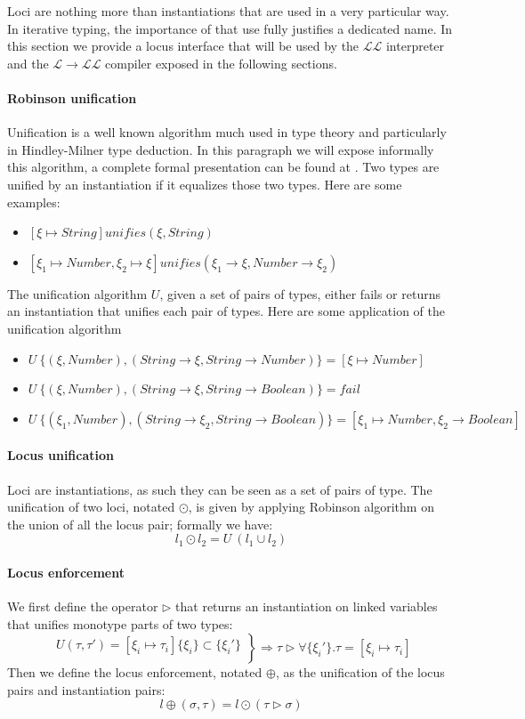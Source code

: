 \documentclass[a4paper]{report}
\newcommand{\lang}[0]{\mathcal{L}}
\begin{document}
Loci are nothing more than instantiations that are used in a very particular way. In iterative typing, the importance of that use fully justifies a dedicated name. In this section we provide a locus interface that will be used by the $\lang\lang$ interpreter and the $\lang\to\lang\lang$ compiler exposed in the following sections.

\paragraph{Robinson unification} Unification is a well known algorithm much used in type theory and particularly in Hindley-Milner type deduction. In this paragraph we will expose informally this algorithm, a complete formal presentation can be found at \cite{robin}. Two types are unified by an instantiation if it equalizes those two types. Here are some examples:
\begin{itemize}
\item $\left[\xi\mapsto String\right] unifies (\xi,String)$
\item $\left[\xi_1\mapsto Number, \xi_2\mapsto \xi\right] unifies (\xi_1\to \xi,Number\to\xi_2)$
\end{itemize}
The unification algorithm $U$, given a set of pairs of types, either fails or returns an instantiation that unifies each pair of types. Here are some application of the unification algorithm
\begin{itemize}
\item $U\ \{(\xi,Number),(String\to\xi,String\to Number)\}=\left[\xi\mapsto Number\right]$
\item $U\ \{(\xi,Number),(String\to\xi,String\to Boolean)\}=fail$
\item $U\ \{(\xi_1,Number),(String\to\xi_2,String\to Boolean)\}=\left[\xi_1\mapsto Number,\xi_2\to Boolean\right]$
\end{itemize}

\paragraph{Locus unification} Loci are instantiations, as such they can be seen as a set of pairs of type. The unification of two loci, notated $\odot$, is given by applying Robinson algorithm on the union of all the locus pair; formally we have:
$$l_1  \odot l_2 = U\ (l_1\cup l_2)$$

\paragraph{Locus enforcement} We first define the operator $\rhd$ that returns an instantiation on linked variables that unifies monotype parts of two types:
$$\left.\begin{array}{r}
U(\tau,\tau')=[\xi_i\mapsto\tau_i]
\{\xi_i\} \subset \{\xi_i'\}\\
\end{array}\right\}\Rightarrow\tau\rhd\forall\{\xi_i'\}.\tau=[\xi_i\mapsto\tau_i]$$
Then we define the locus enforcement, notated $\oplus$, as the unification of the locus pairs and instantiation pairs:
$$l\oplus(\sigma,\tau)=l\odot(\tau\rhd\sigma)$$
\end{document}
